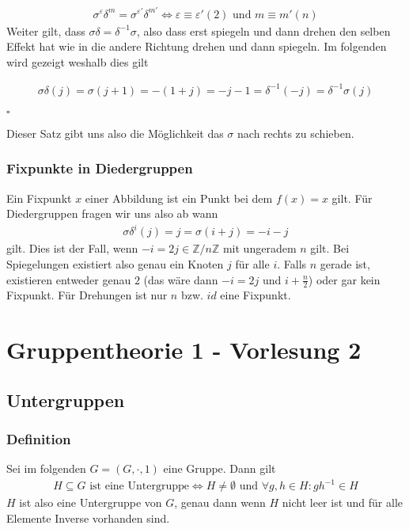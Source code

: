 \documentclass[12pt, german]{article}
\newcommand{\bewiesen}{

\begin{flushright}
		$\square$  \\
\end{flushright}}
\begin{document}
		\begin{align*}
			\sigma^\varepsilon\delta^m = \sigma^{\varepsilon'}\delta^{m'} \iff \varepsilon \equiv \varepsilon' (2) \text{ und } m \equiv m' (n)
		\end{align*}
		Weiter gilt, dass $\sigma\delta = \delta^{-1}\sigma$, also dass erst spiegeln und dann drehen den selben Effekt hat wie in die andere Richtung drehen und dann spiegeln. Im folgenden wird gezeigt weshalb dies gilt
		
		\begin{align*}
			\sigma \delta(j) = \sigma(j+1) = -(1 + j) = -j -1 = \delta^{-1}(-j)=\delta^{-1}\sigma(j)
		\end{align*}
		\bewiesen
		Dieser Satz gibt uns also die Möglichkeit das $\sigma$ nach rechts zu schieben.
		
\subsubsection{Fixpunkte in Diedergruppen}
		Ein Fixpunkt $x$ einer Abbildung ist ein Punkt bei dem $f(x) = x$ gilt. Für Diedergruppen fragen wir uns also ab wann 
		\begin{align*}
			\sigma\delta^i(j) = j = \sigma(i+j) = -i -j
		\end{align*} gilt. 
		Dies ist der Fall, wenn $-i = 2j \in \mathbb Z /n \mathbb Z$ mit ungeradem $n$ gilt. Bei Spiegelungen existiert also genau ein Knoten $j$ für alle $i$. Falls $n$ gerade ist, existieren entweder genau $2$ (das wäre dann $-i = 2j$ und $ i + \frac{n}{2}$) oder gar kein Fixpunkt. Für Drehungen ist nur $n$ bzw. $id$ eine Fixpunkt. 
		
		
\section{Gruppentheorie 1 - Vorlesung 2}
\subsection{Untergruppen}
\subsubsection{Definition}
		Sei im folgenden $G=(G, \cdot, 1)$ eine Gruppe. Dann gilt 
		\begin{align*}
			H \subseteq G \text{ ist eine Untergruppe} \iff H \not = \emptyset \text{ und } \forall g, h \in H : gh^{-1} \in H
		\end{align*}
		$H$ ist also eine Untergruppe von $G$, genau dann wenn $H$ nicht leer ist und für alle Elemente Inverse vorhanden sind.  
\end{document}
